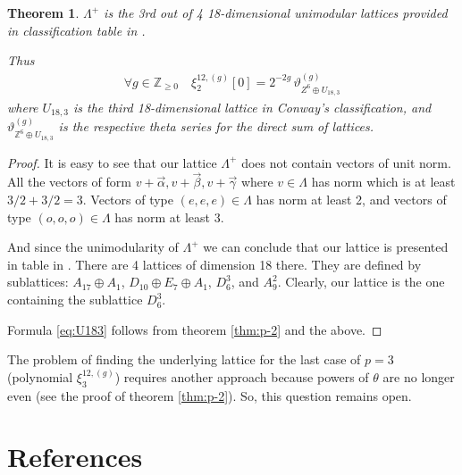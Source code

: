 \documentclass{article}
\newcommand{\ZZ}{\mathbb{Z}}
\theoremstyle{plain}
\newtheorem{theorem}{Theorem}[section]
\theoremstyle{definition}
\begin{document}
    \begin{theorem}\label{thm:classification-of-lambda}
        $\Lambda^+$ is the 3rd out of 4 18-dimensional unimodular lattices
        provided in classification 
        table in \cite[Section~16.4, Table~16.7]{conway}.

        Thus \begin{align}\label{eq:U183}
        \forall g \in\mathbb{Z}_{\geq 0} \quad  \xi^{12,(g)}_2 [0] = 2^{-2g}\, \vartheta^{(g)}_{Z^6\oplus U_{18,3}}
        \end{align}
        where  $U_{18,3}$ is the third 18-dimensional lattice in Conway's classification, and $\vartheta^{(g)}_{\ZZ^6\oplus U_{18,3}}$ is the respective theta series for the direct sum of lattices.
    \end{theorem}
    \begin{proof}
        It is easy to see that our lattice $\Lambda^+$ does not contain vectors of unit norm. All the 
        vectors of form $v + \vec{\alpha}, v + \vec{\beta}, v + \vec{\gamma}$ where $v \in \Lambda$ 
        has norm which is at least $3/2+3/2=3$. 
        Vectors of type $(e, e, e) \in \Lambda$ has norm at least 2,
        and vectors of type $(o, o, o) \in \Lambda$ has norm at least 3.

        And since the unimodularity of $\Lambda^+$ we can conclude that our lattice is presented
        in table in \cite[Section~16.4, Table~16.7]{conway}. 
        There are 4 lattices of dimension 18 there. 
        They are defined by sublattices: $A_{17}\oplus A_1$, $D_{10} \oplus E_7 \oplus A_1$,
        $D_6^3$, and $A_9^2$. Clearly, our lattice is the one containing the sublattice $D_6^3$.

        Formula \eqref{eq:U183} follows from theorem \ref{thm:p-2} and the above.
    \end{proof}
    
    

    The problem of finding the underlying lattice for the
    last case of $p=3$ (polynomial $\xi_3^{12, (g)}$)
    requires another approach because powers of $\theta$ are no longer even (see the proof of 
    theorem \ref{thm:p-2}).
    So, this question remains open.
\section{References}
\printbibliography
\end{document}
